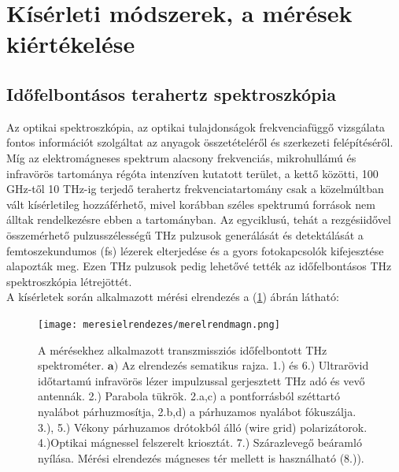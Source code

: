 \documentclass[a4paper,12pt]{article}
\numberwithin{equation}{section}
\begin{document}
 
 
 

\newpage
\section{Kísérleti módszerek, a mérések kiértékelése}



\subsection{Időfelbontásos terahertz spektroszkópia }
Az optikai spektroszkópia, az optikai tulajdonságok frekvenciafüggő vizsgálata fontos információt szolgáltat az anyagok összetételéről és szerkezeti felépítéséről. Míg az elektromágneses spektrum alacsony frekvenciás, mikrohullámú és infravörös tartománya régóta intenzíven kutatott terület, a kettő közötti, 100 GHz-től 10 THz-ig terjedő terahertz frekvenciatartomány csak a közelmúltban vált kísérletileg hozzáférhető, mivel korábban széles spektrumú források nem álltak rendelkezésre ebben a tartományban. Az egyciklusú, tehát a rezgésiidővel összemérhető pulzusszélességű THz pulzusok generálását és detektálását a femtoszekundumos (fs) lézerek elterjedése és a gyors fotokapcsolók kifejesztése alapozták meg. Ezen THz pulzusok pedig lehetővé tették az időfelbontásos THz spektroszkópia létrejöttét.\\

A kísérletek során alkalmazott mérési elrendezés a (\ref{fig:merelrend}) ábrán látható:

\begin{figure}[H]
\begin{center}


\texttt{[image: meresielrendezes/merelrendmagn.png]}




\end{center}
\caption{A mérésekhez alkalmazott transzmissziós időfelbontott THz spektrométer. $\bm{a)}$ Az elrendezés sematikus rajza. 1.) és 6.) Ultrarövid időtartamú infravörös lézer impulzussal gerjesztett THz adó és vevő antennák. 2.) Parabola tükrök. 2.a,c) a pontforrásból széttartó nyalábot párhuzmosítja, 2.b,d) a párhuzamos nyalábot fókuszálja. 3.), 5.) Vékony párhuzamos drótokból álló (wire grid) polarizátorok. 4.)Optikai mágnessel felszerelt kriosztát. 7.) Szárazlevegő beáramló nyílása. Mérési elrendezés mágneses tér mellett is használható (8.)).}

\label{fig:merelrend}
\end{figure}
\end{document}
